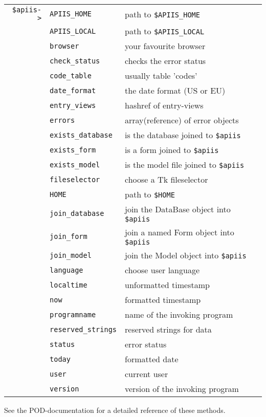 \smallskip
\begin{tabular}{rl|l}
\verb+$apiis->+& \verb+APIIS_HOME+       & path to \verb+$APIIS_HOME+  \\
               & \verb+APIIS_LOCAL+      & path to \verb+$APIIS_LOCAL+ \\
               & \verb+browser+          & your favourite browser \\
               & \verb+check_status+     & checks the error status \\
               & \verb+code_table+       & usually table 'codes' \\
               & \verb+date_format+      & the date format (US or EU) \\
               & \verb+entry_views+      & hashref of entry-views \\
               & \verb+errors+           & array(reference) of error objects \\
               & \verb+exists_database+  & is the database joined to \verb+$apiis+ \\
               & \verb+exists_form+      & is a form joined to \verb+$apiis+\\
               & \verb+exists_model+     & is the model file joined to \verb+$apiis+ \\
               & \verb+fileselector+     & choose a Tk fileselector \\
               & \verb+HOME+             & path to \verb+$HOME+ \\
               & \verb+join_database+    & join the DataBase object into \verb+$apiis+ \\
               & \verb+join_form+        & join a named Form object into \verb+$apiis+ \\
               & \verb+join_model+       & join the Model object into \verb+$apiis+ \\
               & \verb+language+         & choose user language \\
               & \verb+localtime+        & unformatted timestamp \\
               & \verb+now+              & formatted timestamp \\
               & \verb+programname+      & name of the invoking program \\
               & \verb+reserved_strings+ & reserved strings for data \\
               & \verb+status+           & error status \\
               & \verb+today+            & formatted date \\
               & \verb+user+             & current user \\
               & \verb+version+          & version of the invoking program \\
\end{tabular}

\smallskip
See the POD-documentation for a detailed reference of these methods.


